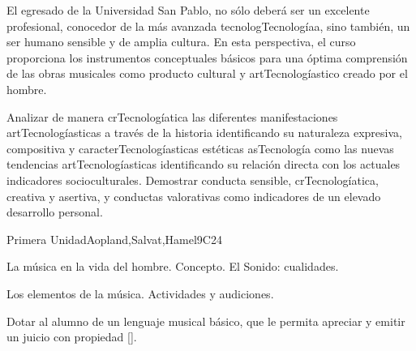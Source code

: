 \begin{syllabus}


\begin{justification}
El egresado de la Universidad San Pablo, no sólo deberá ser un excelente profesional, conocedor de la más avanzada tecnologTecnologíaa, sino también, un ser humano sensible y de amplia cultura. En esta perspectiva, el curso proporciona los instrumentos conceptuales básicos para una óptima comprensión de las obras musicales como producto cultural y artTecnologíastico creado por el hombre.
\end{justification}

\begin{goals}
\item Analizar de manera crTecnologíatica las diferentes manifestaciones artTecnologíasticas a través de la historia identificando su naturaleza expresiva, compositiva y caracterTecnologíasticas estéticas asTecnología como las nuevas tendencias artTecnologíasticas identificando su relación directa con los actuales indicadores socioculturales. Demostrar conducta sensible, crTecnologíatica, creativa y asertiva, y conductas valorativas como indicadores de un elevado desarrollo personal.
\end{goals}

\begin{outcomes}
    \item {}
    \item {}
\end{outcomes}

\begin{competences}
    \item {}
\end{competences}

\begin{unit}{}{Primera Unidad}{Aopland,Salvat,Hamel}{9}{C24}
\begin{topics}
	\item La música en la vida del hombre. Concepto. El Sonido: cualidades.
	\item Los elementos de la música. Actividades y audiciones.
\end{topics}
\begin{learningoutcomes}
	\item Dotar al alumno de un lenguaje musical básico, que le permita apreciar y emitir un juicio con propiedad [\Usage].
\end{learningoutcomes}
\end{unit}


\end{syllabus}
